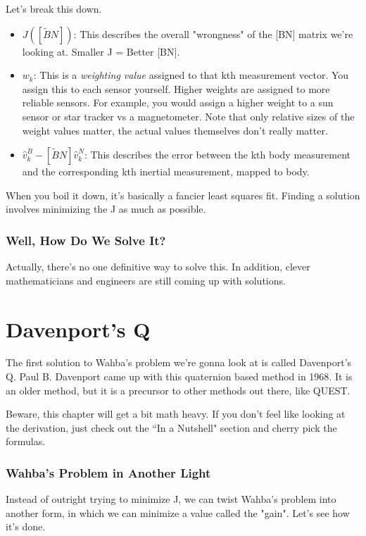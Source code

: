 \documentclass[a4paper,14pt]{extreport}
\begin{document}
Let's break this down.
\begin{itemize}
\item{$J([\tilde{B}N])$: This describes the overall "wrongness" of the [BN] matrix we're looking at. Smaller J = Better [BN].
}
\item{$w_k$: This is a \emph{weighting value} assigned to that kth measurement vector. You assign this to each sensor yourself. Higher weights are assigned to more reliable sensors. For example, you would assign a higher weight to a sun sensor or star tracker vs a magnetometer. Note that only relative sizes of the weight values matter, the actual values themselves don't really matter.
}
\item{$\hat{v}_k^B - [\tilde{B}N]\hat{v}_k^N$: This describes the error between the kth body measurement and the corresponding kth inertial measurement, mapped to body.}
\end{itemize}

When you boil it down, it's basically a fancier least squares fit. Finding a solution involves minimizing the J as much as possible.

\subsection{Well, How Do We Solve It?}
Actually, there's no one definitive way to solve this. In addition, clever mathematicians and engineers are still coming up with solutions.
\chapter{Davenport's Q}
The first solution to Wahba's problem we're gonna look at is called Davenport's Q. Paul B. Davenport came up with this quaternion based method in 1968. It is an older method, but it is a precursor to other methods out there, like QUEST. 

Beware, this chapter will get a bit math heavy. If you don't feel like looking at the derivation, just check out the ``In a Nutshell" section and cherry pick the formulas.

\subsection{Wahba's Problem in Another Light}
Instead of outright trying to minimize J, we can twist Wahba's problem into another form, in which we can minimize a value called the "gain". Let's see how it's done. 
\end{document}
